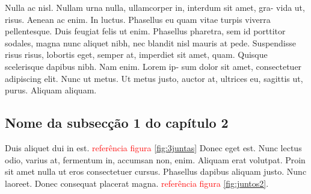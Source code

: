Nulla ac nisl. Nullam urna nulla, ullamcorper in, interdum sit amet, gra- vida ut, risus. Aenean ac enim. In luctus. Phasellus eu quam vitae turpis viverra pellentesque. Duis feugiat felis ut enim. Phasellus pharetra, sem id porttitor sodales, magna nunc aliquet nibh, nec blandit nisl mauris at pede. Suspendisse risus risus, lobortis eget, semper at, imperdiet sit amet, quam. Quisque scelerisque dapibus nibh. Nam enim. Lorem ip- sum dolor sit amet, consectetuer adipiscing elit. Nunc ut metus. Ut metus justo, auctor at, ultrices eu, sagittis ut, purus. Aliquam aliquam.

\subsection{Nome da subsecção 1 do capítulo 2}
Duis aliquet dui in est.  \textcolor{red}{referência figura} \ref{fig:3juntas} Donec eget est. Nunc lectus odio, varius at, fermentum in, accumsan non, enim. Aliquam erat volutpat. Proin sit amet nulla ut eros consectetuer cursus. Phasellus dapibus aliquam justo. Nunc laoreet. Donec consequat placerat magna. \textcolor{red}{referência figura} \ref{fig:juntos2}.

